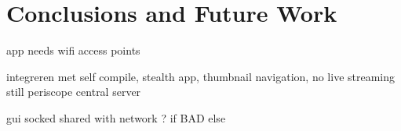 \chapter{Conclusions and Future Work}
app needs wifi access points


integreren met self compile, stealth app, thumbnail navigation, no live streaming still
periscope central server

gui socked shared with network ? if BAD else



